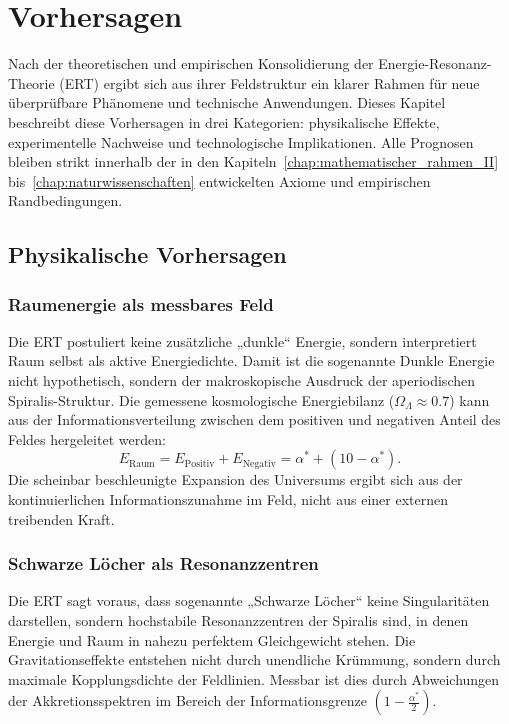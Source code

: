 \chapter{Vorhersagen}
\label{chap:vorhersagen}

Nach der theoretischen und empirischen Konsolidierung der Energie-Resonanz-Theorie (ERT) ergibt sich aus ihrer Feldstruktur ein klarer Rahmen für neue überprüfbare Phänomene und technische Anwendungen. 
Dieses Kapitel beschreibt diese Vorhersagen in drei Kategorien: physikalische Effekte, experimentelle Nachweise und technologische Implikationen. 
Alle Prognosen bleiben strikt innerhalb der in den Kapiteln~\ref{chap:mathematischer_rahmen_II} bis~\ref{chap:naturwissenschaften} entwickelten Axiome und empirischen Randbedingungen.

\section{Physikalische Vorhersagen}
\label{sec:physikalisch}
\subsection{Raumenergie als messbares Feld}
Die ERT postuliert keine zusätzliche „dunkle“ Energie, sondern interpretiert Raum selbst als aktive Energiedichte. 
Damit ist die sogenannte Dunkle Energie nicht hypothetisch, sondern der makroskopische Ausdruck der aperiodischen Spiralis-Struktur. 
Die gemessene kosmologische Energiebilanz (\(\Omega_\Lambda \approx 0.7\)) kann aus der Informationsverteilung zwischen dem positiven und negativen Anteil des Feldes hergeleitet werden:
\[
E_\text{Raum} = E_\text{Positiv} + E_\text{Negativ} = \alpha^* + (10 - \alpha^*).
\]
Die scheinbar beschleunigte Expansion des Universums ergibt sich aus der kontinuierlichen Informationszunahme im Feld, 
nicht aus einer externen treibenden Kraft.

\subsection{Schwarze Löcher als Resonanzzentren}
Die ERT sagt voraus, dass sogenannte „Schwarze Löcher“ keine Singularitäten darstellen, 
sondern hochstabile Resonanzzentren der Spiralis sind, in denen Energie und Raum in nahezu perfektem Gleichgewicht stehen. 
Die Gravitationseffekte entstehen nicht durch unendliche Krümmung, sondern durch maximale Kopplungsdichte der Feldlinien. 
Messbar ist dies durch Abweichungen der Akkretionsspektren im Bereich der Informationsgrenze \((1-\tfrac{\alpha^*}{2})\).

